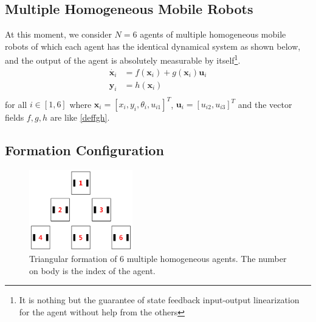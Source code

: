 \documentclass[11pt, a4paper, oneside, openany, reqno]{book}
\theoremstyle{definition}
\theoremstyle{remark}
\numberwithin{equation}{chapter} %
\newcommand{\x}{\textbf{x}}
\newcommand{\y}{\textbf{y}}
\newcommand{\U}{\textbf{u}}
\begin{document}
\subsection{Multiple Homogeneous Mobile Robots}
At this moment, we consider $ N=6 $ agents of multiple homogeneous mobile robots
of which each agent has the identical dynamical system as shown below, and 
the output of the agent is absolutely measurable by itself\footnote
{It is nothing but the guarantee of state feedback input-output linearization for the agent
without help from the others}.
\begin{equation}\begin{split}
	\dot{\x_i} &= f(\x_i) + g(\x_i) \U_i \\
	\y_i &= h(\x_i) \\
\end{split}\end{equation}
for all $ i \in \left[ 1,6 \right] $ where $ \x_i =\left[ x_i, y_i, \theta_i, u_{i1} \right]^T $,
$ \U_i = \left[ u_{i2}, u_{i3} \right]^T $
and the vector fields $ f,g,h $ are like \eqref{deffgh}.

\subsection{Formation Configuration}
\begin{figure}[htp]
	\centering
	\includegraphics[width=0.40\textwidth]{formation.png}
	\caption{Triangular formation of $ 6 $ multiple homogeneous agents. 
			The number on body is the index of the agent.}
\end{figure}
\end{document}
